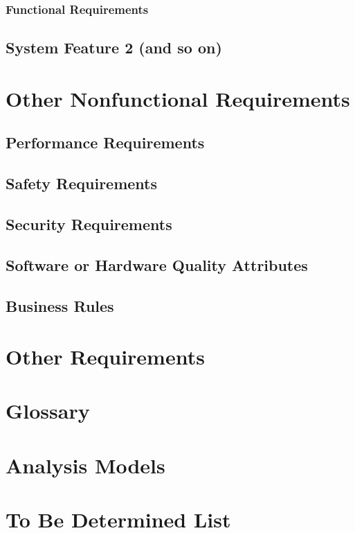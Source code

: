 \documentclass[english]{article}
\numberwithin{equation}{section} %
\begin{document}
\subsubsection{Functional Requirements}
\subsection{System Feature 2 (and so on)}

\newpage
\section{Other Nonfunctional Requirements}
\subsection{Performance Requirements}
\subsection{Safety Requirements}
\subsection{Security Requirements}
\subsection{Software or Hardware Quality Attributes}
\subsection{Business Rules}

\newpage
\section{Other Requirements}
\appendix
\section{Glossary}
\section{Analysis Models}
\section{To Be Determined List}
\end{document}

